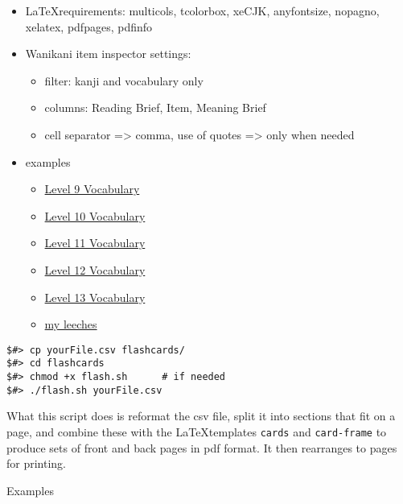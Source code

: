 \documentclass[letterpaper]{article}
\begin{document}
	
	\begin{itemize}
		\item[] \LaTeX requirements: multicols, tcolorbox, xeCJK, anyfontsize, nopagno, xelatex, pdfpages, pdfinfo
		\item[] Wanikani item inspector settings:
		\begin{itemize}
			\item[] filter: kanji and vocabulary only
			\item[] columns: Reading Brief, Item, Meaning Brief
			\item[] cell separator => comma, use of quotes => only when needed
		\end{itemize}
		\item[] examples
			\begin{itemize}
            \item[] \href{https://gwmatthews.github.io/vocab-9.pdf}{Level 9 Vocabulary}
\item[] \href{https://gwmatthews.github.io/vocab-10.pdf}{Level 10 Vocabulary}
\item[] \href{https://gwmatthews.github.io/vocab-11.pdf}{Level 11 Vocabulary}
\item[] \href{https://gwmatthews.github.io/vocab-12.pdf}{Level 12 Vocabulary}
\item[] \href{https://gwmatthews.github.io/vocab-13.pdf}{Level 13 Vocabulary}
\item[] \href{https://gwmatthews.github.io/leeches.pdf}{my leeches}

			\end{itemize}
	\end{itemize}




\begin{verbatim}
$#> cp yourFile.csv flashcards/
$#> cd flashcards
$#> chmod +x flash.sh      # if needed
$#> ./flash.sh yourFile.csv

\end{verbatim}

What this script does is reformat the csv file, split it into sections that fit on a page, and combine these with the \LaTeX templates \verb|cards| and \verb|card-frame| to produce sets of front and back pages in pdf format. It then rearranges to pages for printing.	
	
	
	\vfill\eject\pagebreak
	
	\vspace*{2cm}
	
	{\LARGE Examples}
	
\end{document}
